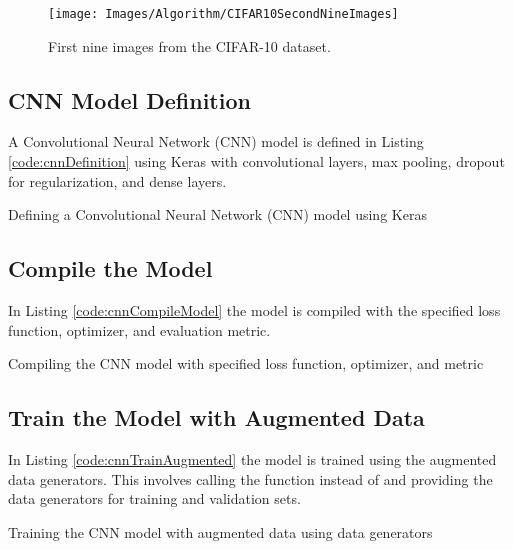 \begin{figure}[h!]
	\centering
	\texttt{[image: Images/Algorithm/CIFAR10SecondNineImages]}
	\caption{First nine images from the CIFAR-10 dataset.} \label{fig:cnnFirstNineCifar10}
\end{figure}

\subsection{CNN Model Definition}

A Convolutional Neural Network (CNN) model is defined in Listing \ref{code:cnnDefinition} using Keras with convolutional layers, max pooling, dropout for regularization, and dense layers.

\begin{code}[h!]
	    
	\caption{Defining a Convolutional Neural Network (CNN) model using Keras}
	\label{code:cnnDefinition}
\end{code}

\subsection{Compile the Model}

In Listing \ref{code:cnnCompileModel} the model is compiled with the specified loss function, optimizer, and evaluation metric.

\begin{code}[h!]
	    
	\caption{Compiling the CNN model with specified loss function, optimizer, and metric}
	\label{code:cnnCompileModel}
\end{code}

\subsection{Train the Model with Augmented Data}

In Listing \ref{code:cnnTrainAugmented} the model is trained using the augmented data generators. This involves calling the  function instead of  and providing the data generators for training and validation sets.

\begin{code}[h!]
	    
	\caption{Training the CNN model with augmented data using data generators}
	\label{code:cnnTrainAugmented}
\end{code}


